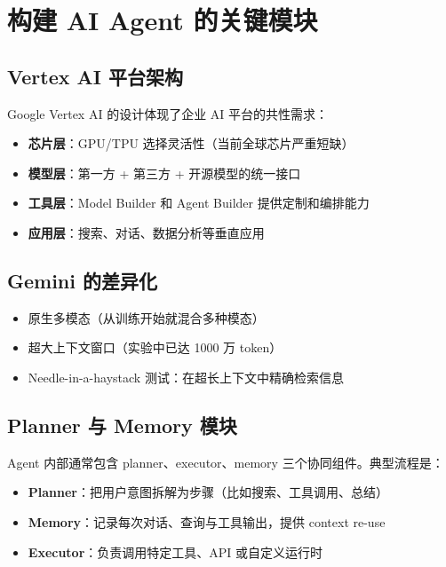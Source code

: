 \section{构建 AI Agent 的关键模块}

\subsection{Vertex AI 平台架构}

Google Vertex AI 的设计体现了企业 AI 平台的共性需求：

\begin{itemize}
    \item \textbf{芯片层}：GPU/TPU 选择灵活性（当前全球芯片严重短缺）
    \item \textbf{模型层}：第一方 + 第三方 + 开源模型的统一接口
    \item \textbf{工具层}：Model Builder 和 Agent Builder 提供定制和编排能力
    \item \textbf{应用层}：搜索、对话、数据分析等垂直应用
\end{itemize}

\subsection{Gemini 的差异化}

\begin{itemize}
    \item 原生多模态（从训练开始就混合多种模态）
    \item 超大上下文窗口（实验中已达 1000 万 token）
    \item Needle-in-a-haystack 测试：在超长上下文中精确检索信息
\end{itemize}

\subsection{Planner 与 Memory 模块}

Agent 内部通常包含 planner、executor、memory 三个协同组件。典型流程是：

\begin{itemize}
    \item \textbf{Planner}：把用户意图拆解为步骤（比如搜索、工具调用、总结）
    \item \textbf{Memory}：记录每次对话、查询与工具输出，提供 context re-use
    \item \textbf{Executor}：负责调用特定工具、API 或自定义运行时
\end{itemize}

